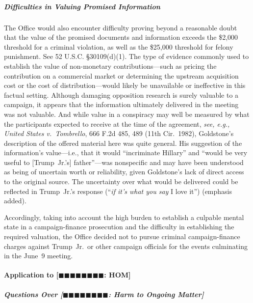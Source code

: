 \subparagraph{Difficulties in Valuing Promised Information}
The Office would also encounter difficulty proving beyond a reasonable doubt that the value of the promised documents and information exceeds the \$2,000 threshold for a criminal violation, as well as the \$25,000 threshold for felony punishment.
See 52 U.S.C. \S 30109(d)(1).
The type of evidence commonly used to establish the value of non-monetary contributions---such as pricing the contribution on a commercial market or determining the upstream acquisition cost or the cost of distribution---would likely be unavailable or ineffective in this factual setting.
Although damaging opposition research is surely valuable to a campaign, it appears that the information ultimately delivered in the meeting was not valuable.
And while value in a conspiracy may well be measured by what the participants expected to receive at the time of the agreement, \textit{see, e.g., United States v.\ Tombrello}, 666 F.2d 485, 489 (11th Cir.~1982), Goldstone's description of the offered material here was quite general.
His suggestion of the information's value---i.e., that it would ``incriminate Hillary'' and ``would be very useful to [Trump~Jr.'s] father''---was nonspecific and may have been understood as being of uncertain worth or reliability, given Goldstone's lack of direct access to the original source.
The uncertainty over what would be delivered could be reflected in Trump~Jr.'s response (``\textit{if it's what you say} I love it'') (emphasis added).

Accordingly, taking into account the high burden to establish a culpable mental state in a campaign-finance prosecution and the difficulty in establishing the required valuation, the Office decided not to pursue criminal campaign-finance charges against Trump~Jr.\ or other campaign officials for the events culminating in the June~9 meeting.

\paragraph{Application to [$\blacksquare\blacksquare\blacksquare\blacksquare\blacksquare\blacksquare\blacksquare\blacksquare$: HOM]}

\subparagraph{Questions Over [$\blacksquare\blacksquare\blacksquare\blacksquare\blacksquare\blacksquare\blacksquare\blacksquare$: Harm to Ongoing Matter]}


